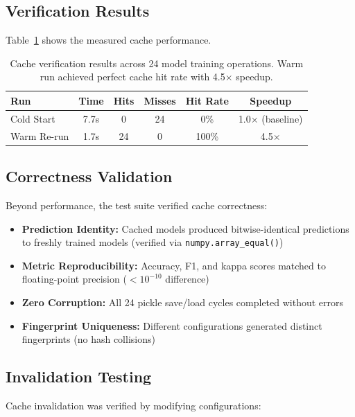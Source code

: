 \documentclass{imc-inf} %
\begin{document}
\subsection{Verification Results}

Table~\ref{tab:cache_verification} shows the measured cache performance.

\begin{table}[ht]
\centering
\begin{tabular}{|l|c|c|c|c|c|}
\hline
\textbf{Run} & \textbf{Time} & \textbf{Hits} & \textbf{Misses} & \textbf{Hit Rate} & \textbf{Speedup} \\
\hline
Cold Start & 7.7s & 0 & 24 & 0\% & 1.0$\times$ (baseline) \\
\hline
Warm Re-run & 1.7s & 24 & 0 & 100\% & 4.5$\times$ \\
\hline
\end{tabular}
\caption{Cache verification results across 24 model training operations. Warm 
run achieved perfect cache hit rate with 4.5$\times$ speedup.}
\label{tab:cache_verification}
\end{table}

\subsection{Correctness Validation}

Beyond performance, the test suite verified cache correctness:

\begin{itemize}
\item \textbf{Prediction Identity:} Cached models produced bitwise-identical  predictions to freshly trained models (verified via \verb|numpy.array_equal()|)
\item \textbf{Metric Reproducibility:} Accuracy, F1, and kappa scores matched 
      to floating-point precision ($<10^{-10}$ difference)
\item \textbf{Zero Corruption:} All 24 pickle save/load cycles completed without errors
\item \textbf{Fingerprint Uniqueness:} Different configurations generated distinct 
      fingerprints (no hash collisions)
\end{itemize}

\subsection{Invalidation Testing}

Cache invalidation was verified by modifying configurations:
\end{document}
